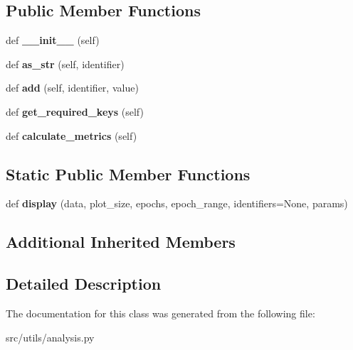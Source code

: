 \subsection*{Public Member Functions}
\begin{DoxyCompactItemize}
\item 
def {\bfseries \+\_\+\+\_\+init\+\_\+\+\_\+} (self)\hypertarget{classanalysis_1_1TextData_abc0c8f9a4ca8d03b74f4107057754c7b}{}\label{classanalysis_1_1TextData_abc0c8f9a4ca8d03b74f4107057754c7b}

\item 
def {\bfseries as\+\_\+str} (self, identifier)\hypertarget{classanalysis_1_1TextData_a38db4fb2346fd42279199c5685d315cc}{}\label{classanalysis_1_1TextData_a38db4fb2346fd42279199c5685d315cc}

\item 
def {\bfseries add} (self, identifier, value)\hypertarget{classanalysis_1_1TextData_a649109d326a4d84e7013915066d38842}{}\label{classanalysis_1_1TextData_a649109d326a4d84e7013915066d38842}

\item 
def {\bfseries get\+\_\+required\+\_\+keys} (self)\hypertarget{classanalysis_1_1TextData_a309c207ba65d54a7f53e75e6714c667d}{}\label{classanalysis_1_1TextData_a309c207ba65d54a7f53e75e6714c667d}

\item 
def {\bfseries calculate\+\_\+metrics} (self)\hypertarget{classanalysis_1_1TextData_ac731deac14f2678823914787a47e8b88}{}\label{classanalysis_1_1TextData_ac731deac14f2678823914787a47e8b88}

\end{DoxyCompactItemize}
\subsection*{Static Public Member Functions}
\begin{DoxyCompactItemize}
\item 
def {\bfseries display} (data, plot\+\_\+size, epochs, epoch\+\_\+range, identifiers=None, params)\hypertarget{classanalysis_1_1TextData_acf5d3cb72c3ee7757be00b23eb394415}{}\label{classanalysis_1_1TextData_acf5d3cb72c3ee7757be00b23eb394415}

\end{DoxyCompactItemize}
\subsection*{Additional Inherited Members}


\subsection{Detailed Description}
\begin{DoxyVerb}\end{DoxyVerb}
 

The documentation for this class was generated from the following file\+:\begin{DoxyCompactItemize}
\item 
src/utils/analysis.\+py\end{DoxyCompactItemize}
